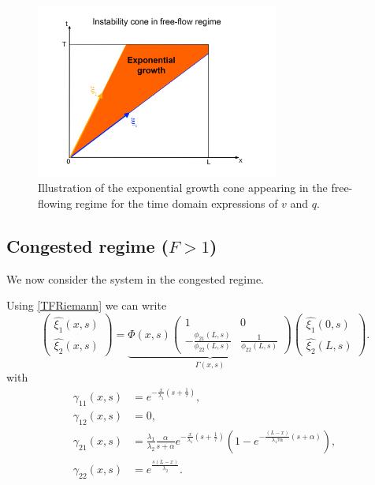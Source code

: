 \documentclass[preprint]{elsarticle}
\begin{document}
\begin{figure}
\begin{centering}
\includegraphics[width=8cm]{Exp-growth}
\par\end{centering}
\protect\caption{Illustration of the exponential growth cone appearing in the free-flowing regime for the time domain expressions of $v$ and $q$.\label{Exp-growth}}
\end{figure}

\subsection{Congested regime ($F>1$)}
We now consider the system in the congested regime.

Using \eqref{TFRiemann} we can write 
\begin{equation} \label{vqcongested}
\begin{pmatrix}
\hat{\xi_{1}}(x,s)\\
\hat{\xi_{2}}(x,s)
\end{pmatrix} = \underbrace{
\Phi(x,s) \begin{pmatrix}
1 & 0\\
-\frac{\phi_{21}\left(L,s\right)}{\phi_{22}\left(L,s\right)} & \frac{1}{\phi_{22}\left(L,s\right)}
\end{pmatrix}}_\text{$\Gamma (x,s)$}
\begin{pmatrix}
\hat{\xi_{1}}\left(0,s\right)\\
\hat{\xi_{2}}\left(L,s\right)
\end{pmatrix}.
\end{equation}
with 
\begin{subequations}
\begin{align}
\gamma_{11}\left(x,s\right)&=
e^{-\frac{x}{\lambda_{1}}\left(s+\frac{1}{\tau}\right)} ,\\
\gamma_{12}\left(x,s\right)&=0, \\
\gamma_{21}\left(x,s\right)&=
\frac{\lambda_{1}}{\lambda_{2}}
\frac{\alpha}{s + \alpha}
e^{-\frac{x}{\lambda_{1}} \left( s + \frac{1}{\tau} \right)}
\left(
	1 -
	e^{-\frac{\left(L - x\right)
		}{
		\lambda_{1}\tau\alpha
		}
		\left(s+\alpha\right)
		}
\right)
, \\
\gamma_{22}\left(x,s\right)&=e^{\frac{s\left(L-x\right)}{\lambda_{2}}}.
\end{align}
\end{subequations}
\end{document}
